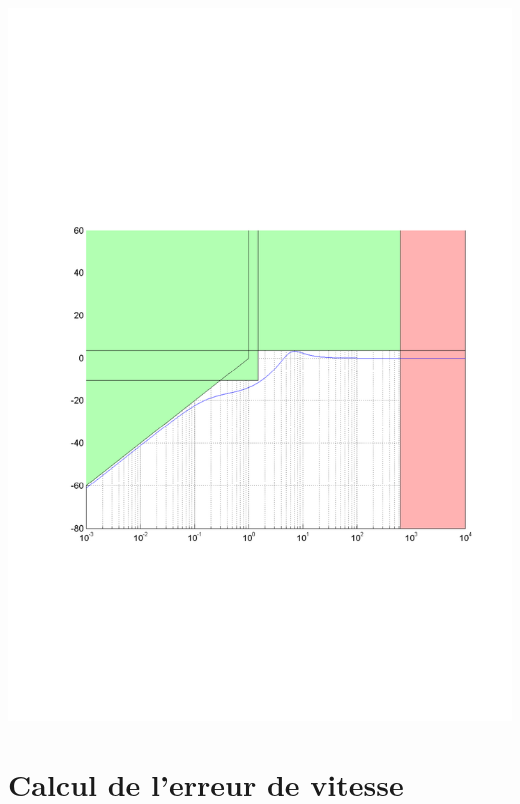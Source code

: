\documentclass[12pt, a4paper, openany]{report}
\begin{document}
\begin{center}
    \includegraphics[scale=0.5]{touslesgabarits.pdf}
    \label{fig11}
  \end{center}

 \section{ Calcul de l'erreur de vitesse} 
 
\end{document}
